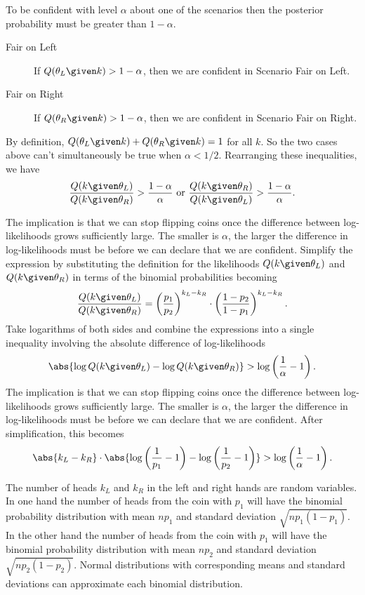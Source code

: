 \documentclass[12pt]{article}
\begin{document}
To be confident with level \( \alpha \) about one of the scenarios then
the posterior probability must be greater than \( 1 - \alpha \).
\begin{description}
    \item[Fair on Left]
        If \( Q(\theta_L \given k)>1 -\alpha \), then we are confident
        in Scenario Fair on Left.
    \item[Fair on Right]
        If \( Q(\theta_R \given k)>1 - \alpha \), then we are confident
        in Scenario Fair on Right.
\end{description}
By definition, \( Q(\theta_L \given k ) + Q(\theta_R \given k ) = 1 \)
for all \( k \).  So the two cases above can't simultaneously be true
when \( \alpha < 1/2 \).  Rearranging these inequalities, we have
\[
    \frac{Q(k \given \theta_L)}{Q(k \given \theta_R)} > \frac{1-\alpha}{\alpha}
    \text{ or } \frac{Q(k \given \theta_R)}{Q(k \given \theta_L)} >
    \frac{1-\alpha}{\alpha}.
\]%

The implication is that we can stop flipping coins once the difference
between log-likelihoods grows sufficiently large.  The smaller is \(
\alpha \), the larger the difference in log-likelihoods must be before
we can declare that we are confident. Simplify the expression by
substituting the definition for the likelihoods \( Q(k \given \theta_L) \)
and \( Q(k \given \theta_R) \) in terms of the binomial probabilities
becoming
\[
    \frac{Q(k \given \theta_L)}{Q(k \given \theta_R)} = \left(\frac{p_1}
    {p_2} \right)^{k_L - k_R} \cdot \left(\frac{1-p_2}{1-p_1} \right)^{k_L
    - k_R}.
\] Take logarithms of both sides and combine the expressions into a
single inequality involving the absolute difference of log-likelihoods
\[
    \abs{\log Q(k \given \theta_L) - \log Q(k \given \theta_R)} > \log
    \left( \frac{1}{\alpha} - 1 \right).
\]%
The implication is that we can stop flipping coins once the difference
between log-likelihoods grows sufficiently large.  The smaller is \(
\alpha \), the larger the difference in log-likelihoods must be before
we can declare that we are confident. After simplification, this becomes
\[
    \abs{k_L - k_R} \cdot \abs{ \log\left( \frac{1}{p_1} - 1 \right) -
    \log\left( \frac{1}{p_2} - 1 \right) } > \log \left( \frac{1}{\alpha}
    - 1 \right).
\]

The number of heads \( k_L \) and \( k_R \) in the left and right hands
are random variables.  In one hand the number of heads from the coin
with \( p_1 \) will have the binomial probability distribution with mean
\( np_1 \) and standard deviation \( \sqrt{np_1(1-p_1)} \). In the other
hand the number of heads from the coin with \( p_1 \) will have the
binomial probability distribution with mean \( np_2 \) and standard
deviation \( \sqrt{np_2(1-p_2)} \).  Normal distributions with
corresponding means and standard deviations can approximate each
binomial distribution.
\end{document}
